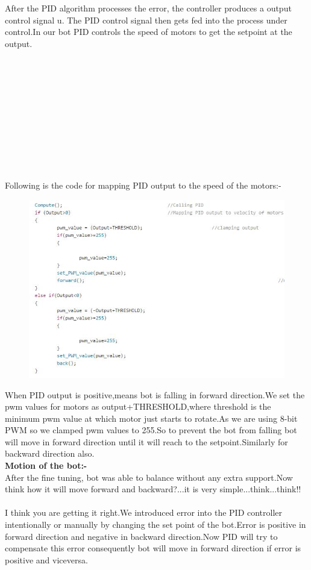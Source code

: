 \documentclass[12pt]{report}
\begin{document}
    After the PID algorithm processes the error, the controller produces a output control signal u. The PID control signal then gets fed into the process under control.In our bot PID controls the speed of motors to get the setpoint at the output.\\ \\ \\ \\ \\ \\ \\ \\ \\ \\ \\ \\ 
    Following is the code for mapping PID output to the speed of the motors:-
    \begin{figure}
    	\includegraphics[scale=0.7]{mapping.jpg}
    \end{figure}
    When PID output is positive,means bot is falling in forward direction.We set the pwm values for motors as output+THRESHOLD,where threshold is the minimum pwm value at which motor just starts to rotate.As we are using 8-bit PWM so we clamped pwm values to 255.So to prevent the bot from falling bot will move in forward direction until it will reach to the setpoint.Similarly for backward direction also.\\
    \textbf{Motion of the bot:-} \\
    After the fine tuning, bot was able to balance without any extra support.Now think how it will move forward and backward?...it is very simple...think...think!! \\ \\
  I think you are getting it right.We introduced error into the PID controller intentionally or manually by changing the set point of the bot.Error is positive in forward direction and negative in backward direction.Now PID will try to compensate this error consequently bot will move in forward direction if error is positive and viceversa.
     
    
\end{document}
